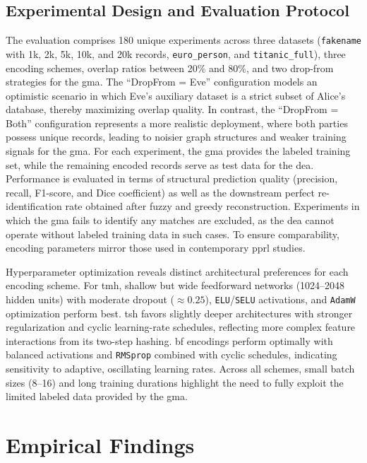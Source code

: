 \documentclass[a4paper,11pt]{scrartcl}
\begin{document}
\subsection{Experimental Design and Evaluation Protocol}
The evaluation comprises 180 unique experiments across three datasets (\texttt{fakename} with 1k, 2k, 5k, 10k, and 20k records, \texttt{euro\_person}, and \texttt{titanic\_full}), three encoding schemes, overlap ratios between 20\% and 80\%, and two drop-from strategies for the \ac{gma}. 
The ``DropFrom = Eve'' configuration models an optimistic scenario in which Eve’s auxiliary dataset is a strict subset of Alice’s database, thereby maximizing overlap quality. 
In contrast, the ``DropFrom = Both'' configuration represents a more realistic deployment, where both parties possess unique records, leading to noisier graph structures and weaker training signals for the \ac{gma}. 
For each experiment, the \ac{gma} provides the labeled training set, while the remaining encoded records serve as test data for the \ac{dea}. 
Performance is evaluated in terms of structural prediction quality (precision, recall, F1-score, and Dice coefficient) as well as the downstream perfect re-identification rate obtained after fuzzy and greedy reconstruction. 
Experiments in which the \ac{gma} fails to identify any matches are excluded, as the \ac{dea} cannot operate without labeled training data in such cases.
To ensure comparability, encoding parameters mirror those used in contemporary \ac{pprl} studies.

Hyperparameter optimization reveals distinct architectural preferences for each encoding scheme. 
For \ac{tmh}, shallow but wide feedforward networks (1024–2048 hidden units) with moderate dropout ($\approx 0.25$), \texttt{ELU}/\texttt{SELU} activations, and \texttt{AdamW} optimization perform best. 
\ac{tsh} favors slightly deeper architectures with stronger regularization and cyclic learning-rate schedules, reflecting more complex feature interactions from its two-step hashing. 
\ac{bf} encodings perform optimally with balanced activations and \texttt{RMSprop} combined with cyclic schedules, indicating sensitivity to adaptive, oscillating learning rates. 
Across all schemes, small batch sizes (8–16) and long training durations highlight the need to fully exploit the limited labeled data provided by the \ac{gma}.

\section{Empirical Findings}
\end{document}
